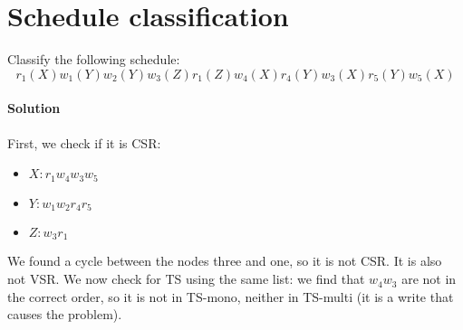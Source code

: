\section{Schedule classification}

Classify the following schedule:
\[r_1(X) w_1(Y) w_2(Y) w_3(Z) r_1(Z) w_4(X) r_4(Y) w_3(X) r_5(Y) w_5(X)\] 

\paragraph*{Solution}
First, we check if it is CSR:
\begin{itemize}
    \item $X: r_1 w_4 w_3 w_5$
    \item $Y: w_1 w_2 r_4 r_5$
    \item $Z: w_3 r_1$
\end{itemize}
We found a cycle between the nodes three and one, so it is not CSR. It is also not VSR. We now check for TS using the same list: 
we find that $w_4 w_3$ are not in the correct order, so it is not in TS-mono, neither in TS-multi (it is a write that causes the 
problem).
